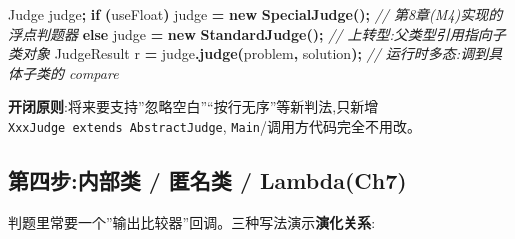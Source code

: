 \documentclass[
  11pt,
]{ctexart}
\newenvironment{Shaded}{\begin{snugshade}}{\end{snugshade}}
\newcommand{\CommentTok}[1]{\textcolor[rgb]{0.56,0.35,0.01}{\textit{#1}}}
\newcommand{\ControlFlowTok}[1]{\textcolor[rgb]{0.13,0.29,0.53}{\textbf{#1}}}
\newcommand{\FunctionTok}[1]{\textcolor[rgb]{0.13,0.29,0.53}{\textbf{#1}}}
\newcommand{\KeywordTok}[1]{\textcolor[rgb]{0.13,0.29,0.53}{\textbf{#1}}}
\newcommand{\NormalTok}[1]{#1}
\newcommand{\OperatorTok}[1]{\textcolor[rgb]{0.81,0.36,0.00}{\textbf{#1}}}
\begin{document}
\begin{Shaded}
\begin{Highlighting}[]
\NormalTok{Judge judge}\OperatorTok{;}
\ControlFlowTok{if} \OperatorTok{(}\NormalTok{useFloat}\OperatorTok{)}\NormalTok{ judge }\OperatorTok{=} \KeywordTok{new} \FunctionTok{SpecialJudge}\OperatorTok{();}   \CommentTok{// 第8章(M4)实现的浮点判题器}
\ControlFlowTok{else}\NormalTok{          judge }\OperatorTok{=} \KeywordTok{new} \FunctionTok{StandardJudge}\OperatorTok{();}  \CommentTok{// 上转型:父类型引用指向子类对象}
\NormalTok{JudgeResult r }\OperatorTok{=}\NormalTok{ judge}\OperatorTok{.}\FunctionTok{judge}\OperatorTok{(}\NormalTok{problem}\OperatorTok{,}\NormalTok{ solution}\OperatorTok{);}   \CommentTok{// 运行时多态:调到具体子类的 compare}
\end{Highlighting}
\end{Shaded}

\textbf{开闭原则}:将来要支持''忽略空白''``按行无序''等新判法,只新增
\texttt{XxxJudge\ extends\ AbstractJudge},
\texttt{Main}/调用方代码完全不用改。

\hypertarget{ux7b2cux56dbux6b65ux5185ux90e8ux7c7b-ux533fux540dux7c7b-lambdach7}{%
\subsection{第四步:内部类 / 匿名类 /
Lambda(Ch7)}\label{ux7b2cux56dbux6b65ux5185ux90e8ux7c7b-ux533fux540dux7c7b-lambdach7}}

判题里常要一个''输出比较器''回调。三种写法演示\textbf{演化关系}:
\end{document}
